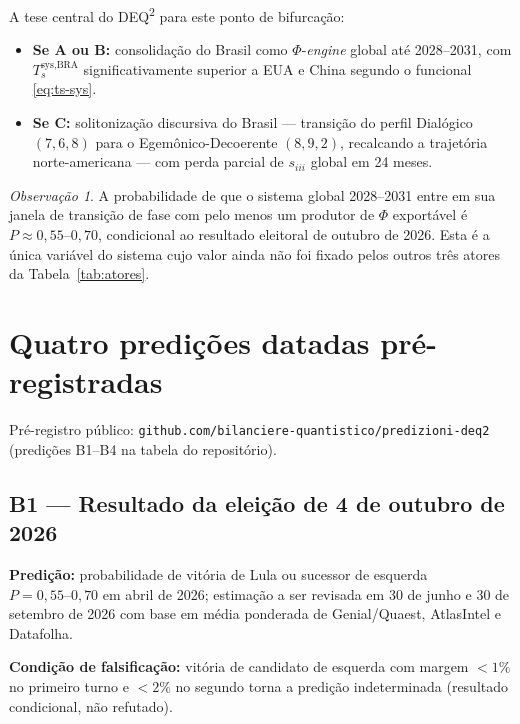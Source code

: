 \documentclass[12pt]{article}
\theoremstyle{definition}
\theoremstyle{remark}
\newtheorem{remark}{Observa\c{c}\~{a}o}
\providecommand{\tightlist}{\setlength{\itemsep}{0pt}\setlength{\parskip}{0pt}}
\begin{document}
A tese central do DEQ\textsuperscript{2} para este ponto de bifurca\c{c}\~{a}o:

\begin{itemize}\tightlist
\item \textbf{Se A ou B:} consolidação do Brasil como \(\Phi\)-\textit{engine} global at\'{e} 2028--2031, com \(T_s^{\text{sys},\text{BRA}}\) significativamente superior a EUA e China segundo o funcional \eqref{eq:ts-sys}.

\item \textbf{Se C:} solitoniza\c{c}\~{a}o discursiva do Brasil --- transi\c{c}\~{a}o do perfil Dial\'{o}gico \((7, 6, 8)\) para o Egem\^{o}nico-Decoerente \((8, 9, 2)\), recalcando a trajet\'{o}ria norte-americana --- com perda parcial de \(s_{iii}\) global em 24 meses.
\end{itemize}

\begin{remark}
A probabilidade de que o sistema global 2028--2031 entre em sua janela de transi\c{c}\~{a}o de fase com pelo menos um produtor de \(\Phi\) export\'{a}vel \'{e} \(P \approx 0,55\text{--}0,70\), condicional ao resultado eleitoral de outubro de 2026. Esta \'{e} a \'{u}nica vari\'{a}vel do sistema cujo valor ainda n\~{a}o foi fixado pelos outros tr\^{e}s atores da Tabela~\ref{tab:atores}.
\end{remark}

\section{Quatro predi\c{c}\~{o}es datadas pr\'{e}-registradas}

Pr\'{e}-registro p\'{u}blico: \texttt{github.com/bilanciere-quantistico/predizioni-deq2} (predi\c{c}\~{o}es B1--B4 na tabela do reposit\'{o}rio).

\subsection{B1 --- Resultado da elei\c{c}\~{a}o de 4 de outubro de 2026}

\textbf{Predi\c{c}\~{a}o:} probabilidade de vit\'{o}ria de Lula ou sucessor de esquerda \(P = 0,55\text{--}0,70\) em abril de 2026; estima\c{c}\~{a}o a ser revisada em 30 de junho e 30 de setembro de 2026 com base em m\'{e}dia ponderada de Genial/Quaest, AtlasIntel e Datafolha.

\textbf{Condi\c{c}\~{a}o de falsifica\c{c}\~{a}o:} vit\'{o}ria de candidato de esquerda com margem \(< 1\%\) no primeiro turno e \(< 2\%\) no segundo torna a predi\c{c}\~{a}o indeterminada (resultado condicional, n\~{a}o refutado).
\end{document}

